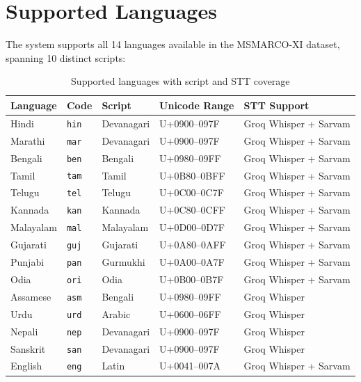 \documentclass[12pt,a4paper]{article}
\begin{document}
\section{Supported Languages}

The system supports all 14 languages available in the MSMARCO-XI dataset, spanning 10 distinct scripts:

\begin{table}[H]
\centering
\small
\begin{tabularx}{\textwidth}{l l l l X}
\toprule
\textbf{Language} & \textbf{Code} & \textbf{Script} & \textbf{Unicode Range} & \textbf{STT Support} \\
\midrule
Hindi     & \texttt{hin} & Devanagari & U+0900--097F & Groq Whisper + Sarvam \\
Marathi   & \texttt{mar} & Devanagari & U+0900--097F & Groq Whisper + Sarvam \\
Bengali   & \texttt{ben} & Bengali    & U+0980--09FF & Groq Whisper + Sarvam \\
Tamil     & \texttt{tam} & Tamil      & U+0B80--0BFF & Groq Whisper + Sarvam \\
Telugu    & \texttt{tel} & Telugu     & U+0C00--0C7F & Groq Whisper + Sarvam \\
Kannada   & \texttt{kan} & Kannada    & U+0C80--0CFF & Groq Whisper + Sarvam \\
Malayalam & \texttt{mal} & Malayalam  & U+0D00--0D7F & Groq Whisper + Sarvam \\
Gujarati  & \texttt{guj} & Gujarati   & U+0A80--0AFF & Groq Whisper + Sarvam \\
Punjabi   & \texttt{pan} & Gurmukhi   & U+0A00--0A7F & Groq Whisper + Sarvam \\
Odia      & \texttt{ori} & Odia       & U+0B00--0B7F & Groq Whisper + Sarvam \\
Assamese  & \texttt{asm} & Bengali    & U+0980--09FF & Groq Whisper \\
Urdu      & \texttt{urd} & Arabic     & U+0600--06FF & Groq Whisper \\
Nepali    & \texttt{nep} & Devanagari & U+0900--097F & Groq Whisper \\
Sanskrit  & \texttt{san} & Devanagari & U+0900--097F & Groq Whisper \\
English   & \texttt{eng} & Latin      & U+0041--007A & Groq Whisper + Sarvam \\
\bottomrule
\end{tabularx}
\caption{Supported languages with script and STT coverage}
\end{table}
\end{document}
